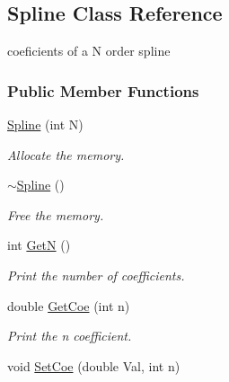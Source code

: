 \hypertarget{classSpline}{}\subsection{Spline Class Reference}
\label{classSpline}


coeficients of a N order spline  


\subsubsection*{Public Member Functions}
\begin{DoxyCompactItemize}
\item 
\hyperlink{classSpline_afe6c93178a46d4e14c44c1d880c20c1b}{Spline} (int N)\hypertarget{classSpline_afe6c93178a46d4e14c44c1d880c20c1b}{}\label{classSpline_afe6c93178a46d4e14c44c1d880c20c1b}

\begin{DoxyCompactList}\small\item\em Allocate the memory. \end{DoxyCompactList}\item 
\hyperlink{classSpline_afe1affe99df46c8cce9f9853471f6e1b}{$\sim$\+Spline} ()\hypertarget{classSpline_afe1affe99df46c8cce9f9853471f6e1b}{}\label{classSpline_afe1affe99df46c8cce9f9853471f6e1b}

\begin{DoxyCompactList}\small\item\em Free the memory. \end{DoxyCompactList}\item 
int \hyperlink{classSpline_a265beffc4c9c8e21a31ae1af9f681f2a}{GetN} ()\hypertarget{classSpline_a265beffc4c9c8e21a31ae1af9f681f2a}{}\label{classSpline_a265beffc4c9c8e21a31ae1af9f681f2a}

\begin{DoxyCompactList}\small\item\em Print the number of coefficients. \end{DoxyCompactList}\item 
double \hyperlink{classSpline_aa2adff2f3dc7758073e3bcf79b67d678}{Get\+Coe} (int n)\hypertarget{classSpline_aa2adff2f3dc7758073e3bcf79b67d678}{}\label{classSpline_aa2adff2f3dc7758073e3bcf79b67d678}

\begin{DoxyCompactList}\small\item\em Print the n coefficient. \end{DoxyCompactList}\item 
void \hyperlink{classSpline_ae74ad20f1ff215326c2ef49911e605b1}{Set\+Coe} (double Val, int n)\hypertarget{classSpline_ae74ad20f1ff215326c2ef49911e605b1}{}\label{classSpline_ae74ad20f1ff215326c2ef49911e605b1}


\end{DoxyCompactItemize}
